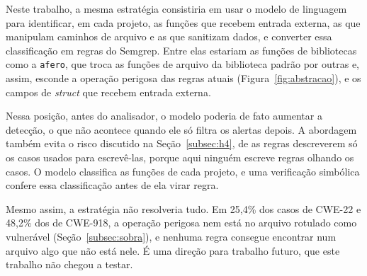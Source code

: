Neste trabalho, a mesma estratégia consistiria em usar o modelo de linguagem para identificar, em cada projeto, as funções que recebem entrada externa, as que manipulam caminhos de arquivo e as que sanitizam dados, e converter essa classificação em regras do Semgrep. Entre elas estariam as funções de bibliotecas como a \texttt{afero}, que troca as funções de arquivo da biblioteca padrão por outras e, assim, esconde a operação perigosa das regras atuais (Figura~\ref{fig:abstracao}), e os campos de \textit{struct} que recebem entrada externa.

Nessa posição, antes do analisador, o modelo poderia de fato aumentar a detecção, o que não acontece quando ele só filtra os alertas depois. A abordagem também evita o risco discutido na Seção~\ref{subsec:h4}, de as regras descreverem só os casos usados para escrevê-las, porque aqui ninguém escreve regras olhando os casos. O modelo classifica as funções de cada projeto, e uma verificação simbólica confere essa classificação antes de ela virar regra.

Mesmo assim, a estratégia não resolveria tudo. Em 25,4\% dos casos de CWE-22 e 48,2\% dos de CWE-918, a operação perigosa nem está no arquivo rotulado como vulnerável (Seção~\ref{subsec:sobra}), e nenhuma regra consegue encontrar num arquivo algo que não está nele. É uma direção para trabalho futuro, que este trabalho não chegou a testar.
